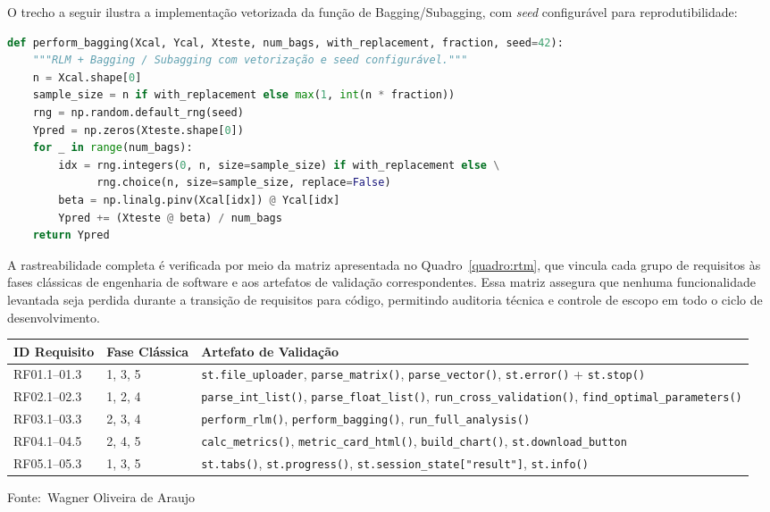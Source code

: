 \documentclass[12pt,a4paper]{article}
\newcommand{\oautor}{Wagner Oliveira de Araujo}
\begin{document}
\newpage
O trecho a seguir ilustra a implementação vetorizada da função de Bagging/Subagging, com \textit{seed} configurável para reprodutibilidade:

\begin{lstlisting}[language=Python]
def perform_bagging(Xcal, Ycal, Xteste, num_bags, with_replacement, fraction, seed=42):
    """RLM + Bagging / Subagging com vetorização e seed configurável."""
    n = Xcal.shape[0]
    sample_size = n if with_replacement else max(1, int(n * fraction))
    rng = np.random.default_rng(seed)
    Ypred = np.zeros(Xteste.shape[0])
    for _ in range(num_bags):
        idx = rng.integers(0, n, size=sample_size) if with_replacement else \
              rng.choice(n, size=sample_size, replace=False)
        beta = np.linalg.pinv(Xcal[idx]) @ Ycal[idx]
        Ypred += (Xteste @ beta) / num_bags
    return Ypred
\end{lstlisting}

\newpage
A rastreabilidade completa é verificada por meio da matriz apresentada no Quadro~\ref{quadro:rtm}, que vincula cada grupo de requisitos às fases clássicas de engenharia de software e aos artefatos de validação correspondentes. Essa matriz assegura que nenhuma funcionalidade levantada seja perdida durante a transição de requisitos para código, permitindo auditoria técnica e controle de escopo em todo o ciclo de desenvolvimento.

\begin{quadro}[!ht]
\centering
\small
\caption{Matriz de rastreabilidade de requisitos (\textit{Requirements Traceability Matrix} - RTM)}
\label{quadro:rtm}
\begin{threeparttable}
\begin{tabularx}{\textwidth}{|l|l|X|} \hline
\textbf{ID Requisito} & \textbf{Fase Clássica} & \textbf{Artefato de Validação} \\ \hline
RF01.1--01.3 & 1, 3, 5 & \texttt{st.file\_uploader}, \texttt{parse\_matrix()}, \texttt{parse\_vector()}, \texttt{st.error()} + \texttt{st.stop()} \\ \hline
RF02.1--02.3 & 1, 2, 4 & \texttt{parse\_int\_list()}, \texttt{parse\_float\_list()}, \texttt{run\_cross\_validation()}, \texttt{find\_optimal\_parameters()} \\ \hline
RF03.1--03.3 & 2, 3, 4 & \texttt{perform\_rlm()}, \texttt{perform\_bagging()}, \texttt{run\_full\_analysis()} \\ \hline
RF04.1--04.5 & 2, 4, 5 & \texttt{calc\_metrics()}, \texttt{metric\_card\_html()}, \texttt{build\_chart()}, \texttt{st.download\_button} \\ \hline
RF05.1--05.3 & 1, 3, 5 & \texttt{st.tabs()}, \texttt{st.progress()}, \texttt{st.session\_state["result"]}, \texttt{st.info()} \\ \hline
\end{tabularx}
\begin{tablenotes}[flushleft]
\footnotesize
\item Fonte:~\oautor
\end{tablenotes}
\end{threeparttable}
\end{quadro}
\end{document}

